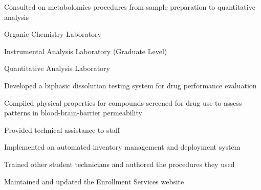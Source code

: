\documentclass[]{deedy-resume-openfont}
\begin{document}
\begin{minipage}[t]{0.7\textwidth}
\begin{tightemize}
\item Consulted on metabolomics procedures from sample preparation to
quantitative analysis
\end{tightemize}

\begin{tightemize}
\item Organic Chemistry Laboratory
\item Instrumental Analysis Laboratory (Graduate Level)
\item Quantitative Analysis Laboratory
\end{tightemize}
\sectionsep

\begin{tightemize}
\item Developed a biphasic dissolution testing system for drug performance
evaluation
\end{tightemize}
\sectionsep

\begin{tightemize}
\item Compiled physical properties for compounds screened for drug use to assess
patterns in blood-brain-barrier permeability
\end{tightemize}
\sectionsep

\begin{tightemize}
\item Provided technical assistance to staff
\item Implemented an automated inventory management and deployment system
\item Trained other student technicians and authored the procedures they used
\item Maintained and updated the Enrollment Services website
\end{tightemize}

\end{minipage}
\hfill
\end{document}
